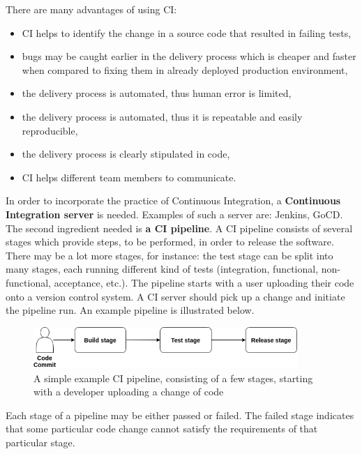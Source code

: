 There are many advantages of using CI\cite{book-cicd}:
\begin{itemize}
\item CI helps to identify the change in a source code that resulted in failing tests,
\item bugs may be caught earlier in the delivery process which is cheaper and faster when compared to fixing them in already deployed production environment,
\item the delivery process is automated, thus human error is limited,
\item the delivery process is automated, thus it is repeatable and easily reproducible,
\item the delivery process is clearly stipulated in code,
\item CI helps different team members to communicate\cite{bachelor-ha}.
\end{itemize}

In order to incorporate the practice of Continuous Integration, a \textbf{Continuous Integration server} is needed. Examples of such a server are: Jenkins\cite{online-jenkins}, GoCD\cite{online-gocd}. The second ingredient needed is \textbf{a CI pipeline}. A CI pipeline consists of several stages which provide steps, to be performed, in order to release the software. There may be a lot more stages, for instance: the test stage can be split into many stages, each running different kind of tests (integration, functional, non-functional, acceptance, etc.)\cite{book-cicd}\cite{bachelor-ha}. The pipeline starts with a user uploading their code onto a version control system. A CI server should pick up a change and initiate the pipeline run\cite{book-pr-devops}. An example pipeline is illustrated below.

\begin{figure}[H]
    \centering
    \includegraphics[width=10cm]{figures/pipeline.png}
    \captionsetup{justification=centering,margin=2cm}
    \caption{A simple example CI pipeline, consisting of a few stages, starting with a developer uploading a change of code}
\end{figure}

Each stage of a pipeline may be either passed or failed. The failed stage indicates that some particular code change cannot satisfy the requirements of that particular stage.

